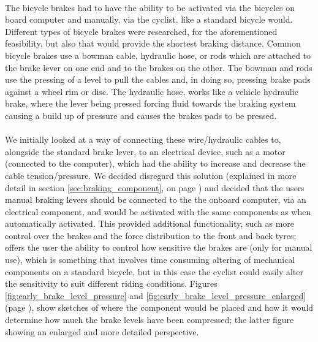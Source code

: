 \documentclass[a4paper]{report}
\begin{document}
{\paragraph{}The bicycle brakes had to have the ability to be activated via the bicycles on board computer and manually, via the cyclist, like a standard bicycle would. Different types of bicycle brakes were researched, for the aforementioned feasibility, but also that would provide the shortest braking distance. Common bicycle brakes use a bowman cable, hydraulic hose, or rods which are attached to the brake lever on one end and to the brakes on the other. The bowman and rods use the pressing of a level to pull the cables and, in doing so, pressing brake pads against a wheel rim or disc. The hydraulic hose, works like a vehicle hydraulic brake, where the lever being pressed forcing fluid towards the braking system causing a build up of pressure and causes the brakes pads to be pressed. 



\paragraph{}We initially looked at a way of connecting these wire/hydraulic cables to, alongside the standard brake lever, to an electrical device, such as a motor (connected to the computer), which had the ability to increase and decrease the cable tension/pressure. We decided disregard this solution (explained in more detail in section \ref{sec:braking_component}, on page \pageref{sec:braking_component}) and decided that the users manual braking levers should be connected to the the onboard computer, via an electrical component, and would be activated with the same components as when automatically activated. This provided additional functionality, such as more control over the brakes and the force distribution to the front and back tyres; offers the user the ability to control how sensitive the brakes are (only for manual use), which is something that involves time consuming altering of mechanical components on a standard bicycle, but in this case the cyclist could easily alter the sensitivity to suit different riding conditions. Figures \ref{fig:early_brake_level_pressure} and \ref{fig:early_brake_level_pressure_enlarged} (page \pageref{app:early_sketches}), show sketches of where the component would be placed and how it would determine how much the brake levels have been compressed; the latter figure showing an enlarged and more detailed perspective.  

}
\end{document}
